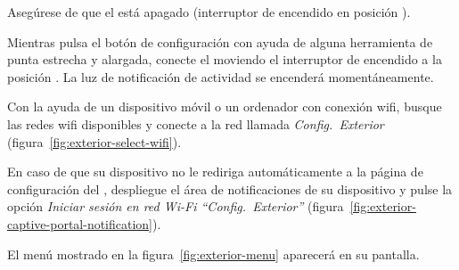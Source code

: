 \begin{enumeratecompact}

\item Asegúrese de que el \ME está apagado (interruptor de encendido  en posición \off).

\item Mientras pulsa el botón de configuración  con ayuda de alguna herramienta de punta estrecha y alargada, conecte el \ME moviendo el interruptor de encendido  a la  posición \on. La luz de notificación de actividad  se encenderá momentáneamente. 

\item Con la ayuda de un dispositivo móvil o un ordenador con conexión wifi, busque las redes wifi disponibles y conecte a la red llamada \emph{Config.~Exterior} (figura~\ref{fig:exterior-select-wifi}).

\item En caso de que su dispositivo no le rediriga automáticamente a la página de configuración del \ME, despliegue el área de notificaciones de su dispositivo y pulse la opción \emph{Iniciar sesión en red Wi-Fi ``Config.~Exterior''} (figura~\ref{fig:exterior-captive-portal-notification}).

\item El menú mostrado en la figura~\ref{fig:exterior-menu} aparecerá en su pantalla.

\end{enumeratecompact}

